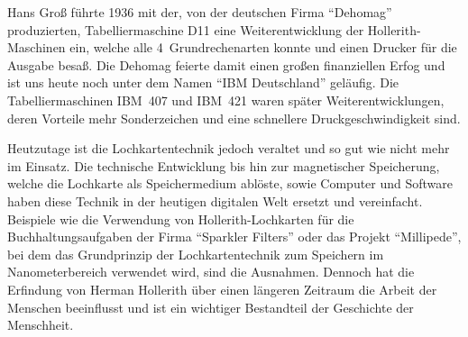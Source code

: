 \documentclass[parskip=half]{scrartcl}
\begin{document}
Hans Groß führte 1936 mit der, von der deutschen Firma \enquote{Dehomag}
produzierten, Tabelliermaschine D11 eine Weiterentwicklung der
Hollerith-Maschinen ein, welche alle 4~Grundrechenarten konnte und einen
Drucker für die Ausgabe besaß. Die Dehomag feierte damit einen großen
finanziellen Erfog und ist uns heute noch unter dem Namen \enquote{IBM
Deutschland} geläufig. Die Tabelliermaschinen IBM~407 und IBM~421 waren später
Weiterentwicklungen, deren Vorteile mehr Sonderzeichen und eine schnellere
Druckgeschwindigkeit sind.

Heutzutage ist die Lochkartentechnik jedoch veraltet und so gut wie nicht mehr
im Einsatz. Die technische Entwicklung bis hin zur magnetischer Speicherung,
welche die Lochkarte als Speichermedium ablöste, sowie Computer und Software
haben diese Technik in der heutigen digitalen Welt ersetzt und vereinfacht.
Beispiele wie die Verwendung von Hollerith-Lochkarten für die
Buchhaltungsaufgaben der Firma \enquote{Sparkler Filters} oder das Projekt
\enquote{Millipede}, bei dem das Grundprinzip der Lochkartentechnik zum
Speichern im Nanometerbereich verwendet wird, sind die Ausnahmen. Dennoch hat
die Erfindung von Herman Hollerith über einen längeren Zeitraum die Arbeit der
Menschen beeinflusst und ist ein wichtiger Bestandteil der Geschichte der
Menschheit.

\printbibliography
\end{document}
